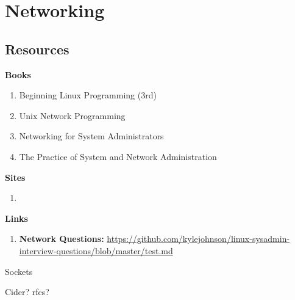 \chapter{Networking}
\section{Resources}
	\textbf{Books}
		\begin{enumerate}
			\item Beginning Linux Programming (3rd)
			\item Unix Network Programming
			\item Networking for System Administrators
			\item The Practice of System and Network Administration
		\end{enumerate}
	\textbf{Sites}
		\begin{enumerate}
			\item
		\end{enumerate}
	\textbf{Links}
		\begin{enumerate}
			\item \textbf{Network Questions: } \url{https://github.com/kylejohnson/linux-sysadmin-interview-questions/blob/master/test.md}
		\end{enumerate}


	\begin{questions}{Sockets}
		\begin{questionAnswer}
		\end{questionAnswer}
	\end{questions}

Cider?
rfcs?

